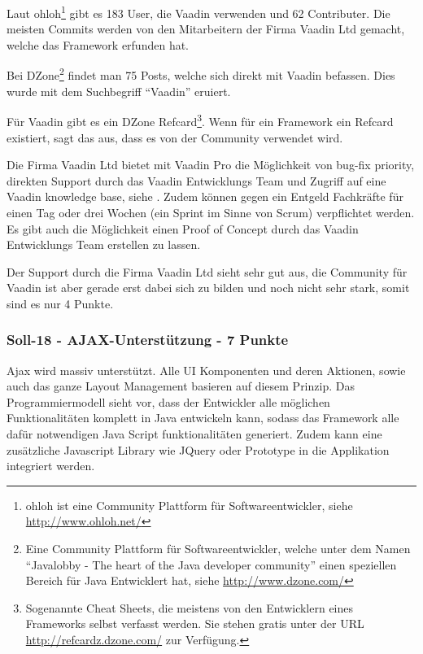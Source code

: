   Laut ohloh\footnote{ohloh ist eine Community Plattform für
  Softwareentwickler, siehe \url{http://www.ohloh.net/}} gibt es 183 User, die
  Vaadin verwenden und 62 Contributer. Die meisten Commits werden von den
  Mitarbeitern der Firma Vaadin Ltd gemacht, welche das Framework
  erfunden hat.
  
  Bei DZone\footnote{Eine Community Plattform für Softwareentwickler, welche
  unter dem Namen ``Javalobby - The heart of the Java developer community''
  einen speziellen Bereich für Java Entwicklert hat, siehe
  \url{http://www.dzone.com/}} findet man 75 Posts, welche sich direkt mit
  Vaadin befassen. Dies wurde mit dem Suchbegriff ``Vaadin'' eruiert.
  
  Für Vaadin gibt es ein DZone Refcard\footnote{Sogenannte Cheat Sheets, die
  meistens von den Entwicklern eines Frameworks selbst verfasst werden. Sie
  stehen gratis unter der \ac{URL} \url{http://refcardz.dzone.com/} zur
  Verfügung.}. Wenn für ein Framework ein Refcard existiert, sagt das aus, dass
  es von der Community verwendet wird.
  
  Die Firma Vaadin Ltd bietet mit Vaadin Pro die Möglichkeit von bug-fix
  priority, direkten Support durch das Vaadin Entwicklungs Team und Zugriff auf
  eine Vaadin knowledge base, siehe \cite{VaadinPro}. Zudem können gegen ein
  Entgeld Fachkräfte für einen Tag oder drei Wochen (ein Sprint im Sinne von
  Scrum) verpflichtet werden. Es gibt auch die Möglichkeit einen Proof of
  Concept durch das Vaadin Entwicklungs Team erstellen zu lassen.
  
  Der Support durch die Firma Vaadin Ltd sieht sehr gut aus, die Community für
  Vaadin ist aber gerade erst dabei sich zu bilden und noch nicht sehr stark, somit
  sind es nur 4 Punkte.

  \subsubsection{Soll-18 - AJAX-Unterstützung - 7 Punkte}
  
  \ac{Ajax} wird massiv unterstützt. Alle \ac{UI} Komponenten und deren
  Aktionen, sowie auch das ganze Layout Management basieren auf diesem Prinzip.
  Das Programmiermodell sieht vor, dass der Entwickler alle möglichen
  Funktionalitäten komplett in Java entwickeln kann, sodass das Framework alle
  dafür notwendigen Java Script funktionalitäten generiert. Zudem kann eine
  zusätzliche Javascript Library wie JQuery oder Prototype in die Applikation
  integriert werden.
  

